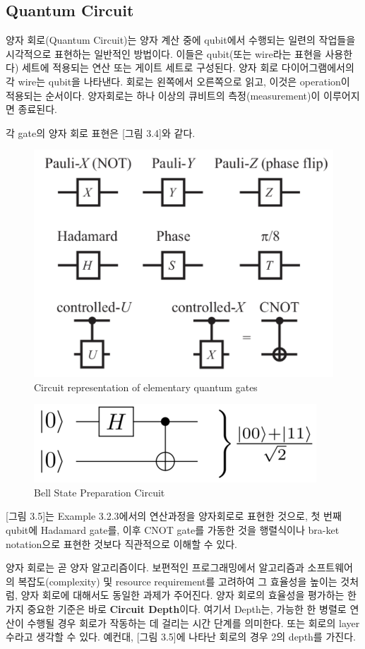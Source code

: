 \subsection{Quantum Circuit} %
양자 회로(Quantum Circuit)는 양자 계산 중에 qubit에서 수행되는 일련의 작업들을 시각적으로 표현하는 일반적인 방법이다. 이들은 qubit(또는 wire라는 표현을 사용한다) 세트에 적용되는 연산 또는 게이트 세트로 구성된다. 양자 회로 다이어그램에서의 각 wire는 qubit을 나타낸다. 회로는 왼쪽에서 오른쪽으로 읽고, 이것은 operation이 적용되는 순서이다. 양자회로는 하나 이상의 큐비트의 측정(measurement)이 이루어지면 종료된다.

각 gate의 양자 회로 표현은 [그림 3.4]와 같다.
\begin{figure}[htb!]
    \centering
    \includegraphics[width=0.45\linewidth]{figs/QuantumGateSymbols.png}
    \caption{Circuit representation of elementary quantum gates}
    \label{fig:quantum gate symbols}
\end{figure}

\begin{figure}[htb!]
    \centering
    \includegraphics[width=0.5\linewidth]{figs/BellStateCircuit.png}
    \caption{Bell State Preparation Circuit}
    \label{fig:bell state circuit}
\end{figure}

[그림 3.5]는 Example 3.2.3에서의 연산과정을 양자회로로 표현한 것으로, 첫 번째 qubit에 Hadamard gate를, 이후 CNOT gate를 가동한 것을 행렬식이나 bra-ket notation으로 표현한 것보다 직관적으로 이해할 수 있다.

양자 회로는 곧 양자 알고리즘이다. 보편적인 프로그래밍에서 알고리즘과 소프트웨어의 복잡도(complexity) 및 resource requirement를 고려하여 그 효율성을 높이는 것처럼, 양자 회로에 대해서도 동일한 과제가 주어진다. 양자 회로의 효율성을 평가하는 한 가지 중요한 기준은 바로 \textbf{Circuit Depth}이다. 여기서 Depth는, 가능한 한 병렬로 연산이 수행될 경우 회로가 작동하는 데 걸리는 시간 단계를 의미한다. 또는 회로의 layer 수라고 생각할 수 있다. 예컨대, [그림 3.5]에 나타난 회로의 경우 2의 depth를 가진다.

